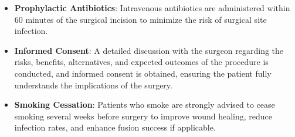 \begin{itemize}
  \item \textbf{Prophylactic Antibiotics}: Intravenous antibiotics are administered within 60 minutes of the surgical incision to minimize the risk of surgical site infection.
  \item \textbf{Informed Consent}: A detailed discussion with the surgeon regarding the risks, benefits, alternatives, and expected outcomes of the procedure is conducted, and informed consent is obtained, ensuring the patient fully understands the implications of the surgery.
  \item \textbf{Smoking Cessation}: Patients who smoke are strongly advised to cease smoking several weeks before surgery to improve wound healing, reduce infection rates, and enhance fusion success if applicable.
\end{itemize}

